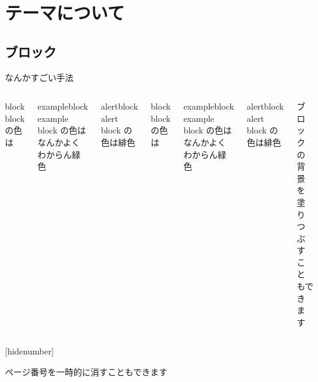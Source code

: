 \section{テーマについて}
\subsection{ブロック}
\begin{frame}{\insertsubsection}
  なんかすごい手法\cite{Ono:2010:LVAICA,Ono:2011:WASPAA,Ono:2012:IWAENC,akhtar:2012:ISCAS,}
  \begin{columns}[T,onlytextwidth]
      \begin{block}{block}
        block の色は
      \end{block}
      \begin{exampleblock}{exampleblock}
        example block の色は\textcolor{example text.fg}{なんかよくわからん緑色}
      \end{exampleblock}
      \begin{alertblock}{alertblock}
        alert block の色は\textcolor{alerted text.fg}{緋色}
      \end{alertblock}
      \begin{block}{block}
        block の色は
      \end{block}
      \begin{exampleblock}{exampleblock}
        example block の色は\textcolor{example text.fg}{なんかよくわからん緑色}
      \end{exampleblock}
      \begin{alertblock}{alertblock}
        alert block の色は\textcolor{alerted text.fg}{緋色}
      \end{alertblock}
      ブロックの背景を塗りつぶすこともできます
  \end{columns}
\end{frame}

{
  [hidenumber]
  \begin{frame}[noframenumbering]{\insertsubsection}
    ページ番号を一時的に消すこともできます
  \end{frame}
}

